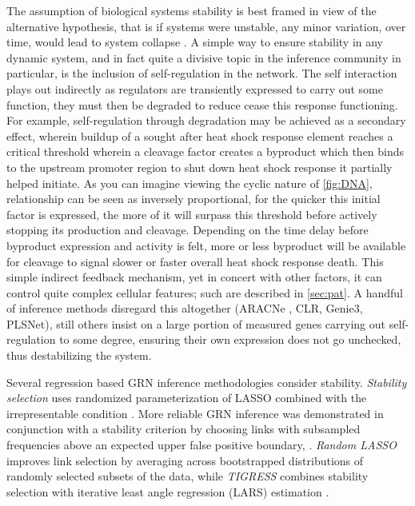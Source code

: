 The assumption of biological systems stability is best framed in view of the alternative hypothesis, that is if systems were unstable, any minor variation, over time, would lead to system collapse \citep{khalil1996adaptive}. A simple way to ensure stability in any dynamic system, and in fact quite a divisive topic in the inference community in particular, is the inclusion of self-regulation in the network. The self interaction plays out indirectly as regulators are transiently expressed to carry out some function, they must then be degraded to reduce cease this response functioning. For example, self-regulation through degradation may be achieved as a secondary effect, wherein buildup of a sought after heat shock response element reaches a critical threshold wherein a cleavage factor creates a byproduct which then binds to the upstream promoter region to shut down heat shock response it partially helped initiate. As you can imagine viewing the cyclic nature of \cref{fig:DNA}, relationship can be seen as inversely proportional, for the quicker this initial factor is expressed, the more of it will surpass this threshold before actively stopping its production and cleavage. Depending on the time delay before byproduct expression and activity is felt, more or less byproduct will be available for cleavage to signal slower or faster overall heat shock response death. This simple indirect feedback mechanism, yet in concert with other factors, it can control quite complex cellular features; such are described in \cref{sec:pat}. A handful of inference methods disregard this  altogether (ARACNe \citep{montes2014aracne}, CLR\citep{faith2007large}, Genie3\citep{GENIE3}, PLSNet\citep{ham1996partial}), still others insist on a large portion of measured genes carrying out self-regulation to some degree, ensuring their own expression does not go unchecked, thus destabilizing the system.

Several regression based GRN inference methodologies consider stability. \textit{Stability selection} uses randomized parameterization of LASSO \citep{tibshirani1996regression}  combined with the irrepresentable condition \citep{zhao2006model}. More reliable GRN inference was demonstrated in conjunction with  a stability criterion by choosing links with subsampled frequencies above an expected upper false positive boundary,  \citep{meinshausen2010stability}.  \textit{Random LASSO} \citep{wang2011random} improves  link selection by averaging across bootstrapped distributions of randomly selected subsets of the data, while \textit{TIGRESS} combines stability selection with iterative least angle regression (LARS) estimation \citep{haury2012tigress}.

